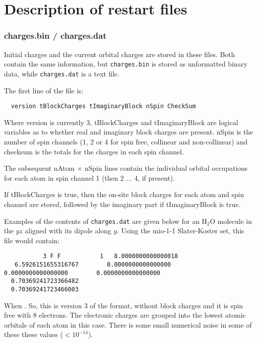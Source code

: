 
\chapter{Description of restart files}
\label{app:restartfiles}

\subsection{charges.bin / charges.dat}

Initial charges and the current orbital charges are stored in these files. Both
contain the same information, but \verb|charges.bin| is stored as unformatted
binary data, while \verb|charges.dat| is a text file.

The first line of the file is:
\begin{verbatim}
  version tBlockCharges tImaginaryBlock nSpin CheckSum
\end{verbatim}

Where version is currently 3, tBlockCharges and tImaginaryBlock are logical
variables as to whether real and imaginary block charges are present. nSpin is
the number of spin channels (1, 2 or 4 for spin free, collinear and
non-collinear) and checksum is the totals for the charges in each spin channel.

The subsequent nAtom $\times$ nSpin lines contain the individual orbital
occupations for each atom in spin channel 1 (then 2 $\ldots$ 4, if present).

If tBlockCharges is true, then the on-site block charges for each atom and spin
channel are stored, followed by the imaginary part if tImaginaryBlock is true.

Examples of the contents of \verb|charges.dat| are given below for an H$_2$O
molecule in the $yz$ aligned with its dipole along $y$.  Using the mio-1-1
Slater-Koster set, this file would contain:
\begin{tiny}
\begin{verbatim}
           3 F F           1   8.0000000000000018
   6.5926151655316767        0.0000000000000000        0.0000000000000000        0.0000000000000000
  0.70369241723366482
  0.70369241723466003
\end{verbatim}
\end{tiny}

When . So, this is version 3 of the format, without
block charges and it is spin free with 8 electrons. The electronic charges are
grouped into the lowest atomic orbitals of each atom in this case. There is some
small numerical noise in some of these these values ($<10^{-14}$).

